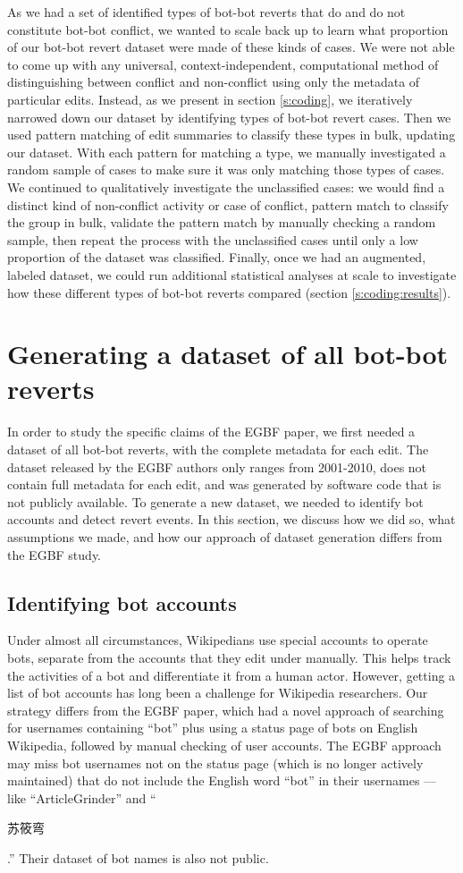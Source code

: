 \documentclass[format=acmsmall, review=false, screen=true]{acmart}%
\begin{document}
As we had a set of identified types of bot-bot reverts that do and do not constitute bot-bot conflict, we wanted to scale back up to learn what proportion of our bot-bot revert dataset were made of these kinds of cases. We were not able to come up with any universal, context-independent, computational method of distinguishing between conflict and non-conflict using only the metadata of particular edits. Instead, as we present in section \ref{s:coding}, we iteratively narrowed down our dataset by identifying types of bot-bot revert cases. Then we used pattern matching of edit summaries to classify these types in bulk, updating our dataset. With each pattern for matching a type, we manually investigated a random sample of cases to make sure it was only matching those types of cases. We continued to qualitatively investigate the unclassified cases: we would find a distinct kind of non-conflict activity or case of conflict, pattern match to classify the group in bulk, validate the pattern match by manually checking a random sample, then repeat the process with the unclassified cases until only a low proportion of the dataset was classified. Finally, once we had an augmented, labeled dataset, we could run additional statistical analyses at scale to investigate how these different types of bot-bot reverts compared (section \ref{s:coding:results}).

\section{Generating a dataset of all bot-bot reverts} \label{s:dataset}
In order to study the specific claims of the EGBF paper, we first needed a dataset of all bot-bot reverts, with the complete metadata for each edit. The dataset released by the EGBF authors only ranges from 2001-2010, does not contain full metadata for each edit, and was generated by software code that is not publicly available. To generate a new dataset, we needed to identify bot accounts and detect revert events. In this section, we discuss how we did so, what assumptions we made, and how our approach of dataset generation differs from the EGBF study.

\subsection{Identifying bot accounts}
Under almost all circumstances, Wikipedians use special accounts to operate bots, separate from the accounts that they edit under manually. This helps track the activities of a bot and differentiate it from a human actor. However, getting a list of bot accounts has long been a challenge for Wikipedia researchers. Our strategy differs from the EGBF paper, which had a novel approach of searching for usernames containing ``bot'' plus using a status page of bots on English Wikipedia, followed by manual checking of user accounts. The EGBF approach may miss bot usernames not on the status page (which is no longer actively maintained) that do not include the English word ``bot'' in their usernames --- like ``ArticleGrinder'' and ``\begin{CJK}{UTF8}{gbsn}苏筱弯\end{CJK}.'' Their dataset of bot names is also not public.
\end{document}
